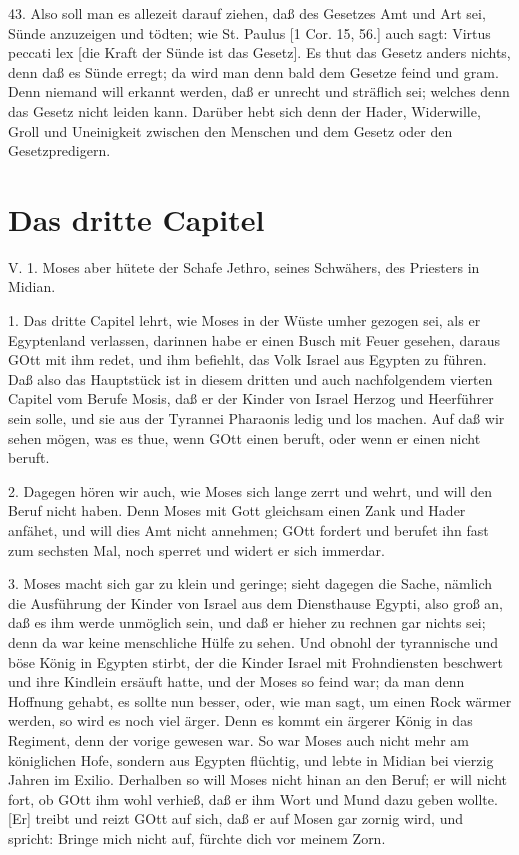 43. Also soll man es allezeit darauf ziehen, daß des Gesetzes Amt und Art sei, Sünde anzuzeigen und tödten; wie St. Paulus [1 Cor. 15, 56.] auch sagt: Virtus peccati lex [die Kraft der Sünde ist das Gesetz]. Es thut das Gesetz anders nichts, denn daß es Sünde erregt; da wird man denn bald dem Gesetze feind und gram. Denn niemand will erkannt werden, daß er unrecht und sträflich sei; welches denn das Gesetz nicht leiden kann. Darüber hebt sich denn der Hader, Widerwille, Groll und Uneinigkeit zwischen den Menschen und dem Gesetz oder den Gesetzpredigern.

\section{Das dritte Capitel}

\begin{schriftzitat}
V. 1. Moses aber hütete der Schafe Jethro, seines Schwähers, des Priesters in Midian.
\end{schriftzitat}

1. Das dritte Capitel lehrt, wie Moses in der Wüste umher gezogen sei, als er Egyptenland verlassen, darinnen habe er einen Busch mit Feuer gesehen, daraus GOtt mit ihm redet, und ihm befiehlt, das Volk Israel aus Egypten zu führen. Daß also das Hauptstück ist in diesem dritten und auch nachfolgendem vierten Capitel vom Berufe Mosis, daß er der Kinder von Israel Herzog und Heerführer sein solle, und sie aus der Tyrannei Pharaonis ledig und los machen. Auf daß wir sehen mögen, was es thue, wenn GOtt einen beruft, oder wenn er einen nicht beruft.

2. Dagegen hören wir auch, wie Moses sich lange zerrt und wehrt, und will den Beruf nicht haben. Denn Moses mit Gott gleichsam einen Zank und Hader anfähet, und will dies Amt nicht annehmen; GOtt fordert und berufet ihn fast zum sechsten Mal, noch sperret und widert er sich immerdar.

3. Moses macht sich gar zu klein und geringe; sieht dagegen die Sache, nämlich die Ausführung der Kinder von Israel aus dem Diensthause Egypti, also groß an, daß es ihm werde unmöglich sein, und daß er hieher zu rechnen gar nichts sei; denn da war keine menschliche Hülfe zu sehen. Und obnohl der tyrannische und böse König in Egypten stirbt, der die Kinder Israel mit Frohndiensten beschwert und ihre Kindlein ersäuft hatte, und der Moses so feind war; da man denn Hoffnung gehabt, es sollte nun besser, oder, wie man sagt, um einen Rock wärmer werden, so wird es noch viel ärger. Denn es kommt ein ärgerer König in das Regiment, denn der vorige gewesen war. So war Moses auch nicht mehr am königlichen Hofe, sondern aus Egypten flüchtig, und lebte in Midian bei vierzig Jahren im Exilio. Derhalben so will Moses nicht hinan an den Beruf; er will nicht fort, ob GOtt ihm wohl verhieß, daß er ihm Wort und Mund dazu geben wollte. [Er] treibt und reizt GOtt
auf sich, daß er auf Mosen gar zornig wird, und spricht: Bringe mich nicht auf, fürchte dich vor meinem Zorn.

